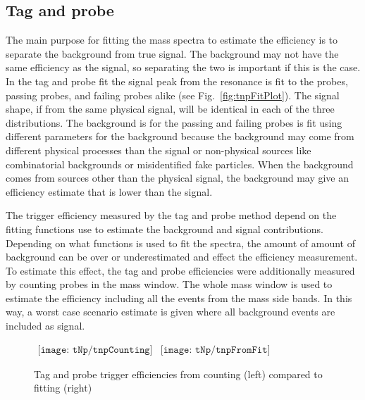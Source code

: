     \subsection{Tag and probe}
      The main purpose for fitting the mass spectra to estimate the efficiency
        is to separate the background from true signal. 
      The background may not have the same efficiency as the signal, so 
        separating the two is important if this is the case.
      In the tag and probe fit the signal peak from the \JPsi{} resonance
        is fit to the probes, passing probes, and failing probes alike (see
        Fig.~\ref{fig:tnpFitPlot}). 
      The signal shape, if from the same physical signal, will be 
        identical in each of the three distributions. 
      The background is for the passing and failing probes is fit using 
        different parameters for the background because the background
        may come from different physical processes than the signal or 
        non-physical sources like combinatorial backgrounds or misidentified
        fake particles.
      When the background comes from sources other than the physical signal,
        the background may give an efficiency estimate that is lower than
        the signal. 

      The trigger efficiency measured by the tag and probe method depend on
        the fitting functions use to estimate the background and signal 
        contributions. 
      Depending on what functions is used to fit the spectra, the amount of
        amount of background can be over or underestimated and effect the 
        efficiency measurement.
      To estimate this effect, the tag and probe efficiencies were additionally
        measured by counting probes in the \JPsi{} mass window. 
      The whole mass window is used to estimate the efficiency including all 
        the events from the mass side bands.
      In this way, a worst case scenario estimate is given where all background
        events are included as signal. 
      \begin{figure}[!Hhbt]
        \centering
        $ \begin{array}{cc}
          \texttt{[image: tNp/tnpCounting]} &
          \texttt{[image: tNp/tnpFromFit]}
        \end{array} $ 
        \caption{Tag and probe trigger efficiencies from counting (left) 
          compared to fitting (right)}
        \label{fig:tnpCntVFit}
      \end{figure}

